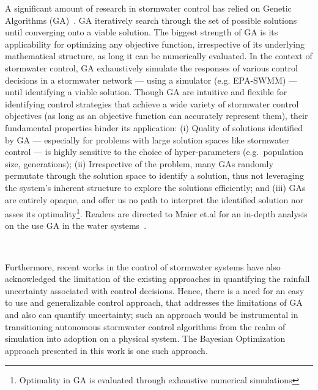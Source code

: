 A significant amount of research in stormwater control has relied on Genetic Algorithms (GA)~\cite{sadler2019, lund2018, Rjeily_2018, Meneses_2018, vezzaro2014}.
GA iteratively search through the set of possible solutions until converging onto a viable solution.
The biggest strength of GA is its applicability for optimizing any objective function, irrespective of its underlying mathematical structure, as long it can be numerically evaluated. 
In the context of stormwater control, GA exhaustively simulate the responses of various control decisions in a stormwater network --- using a simulator (e.g. EPA-SWMM) --- until identifying a viable solution.
Though GA are intuitive and flexible for identifying control strategies that achieve a wide variety of stormwater control objectives (as long as an objective function can accurately represent them), their fundamental properties hinder its application: (i) Quality of solutions identified by GA --- especially for problems with large solution spaces like stormwater control --- is highly sensitive to the choice of hyper-parameters (e.g.\ population size, generations);
(ii) Irrespective of the problem, many GAs randomly permutate through the solution space to identify a solution, thus not leveraging the system's inherent structure to explore the solutions efficiently; and (iii) GAs are entirely opaque, and offer us no path to interpret the identified solution nor asses its optimality\footnote{Optimality in GA is evaluated through exhaustive numerical simulations}.
Readers are directed to Maier et.al for an in-depth analysis on the use GA in the water systems~\cite{maier2014}.

\

Furthermore, recent works in the control of stormwater systems have also acknowledged the limitation of the existing approaches in quantifying the rainfall uncertainty associated with control decisions\cite{sadler2019}.
Hence, there is a need for an easy to use and generalizable control approach, that addresses the limitations of GA and also can quantify uncertainty; such an approach would be instrumental in transitioning autonomous stormwater control algorithms from the realm of simulation into adoption on a physical system. The Bayesian Optimization approach presented in this work is one such approach.

